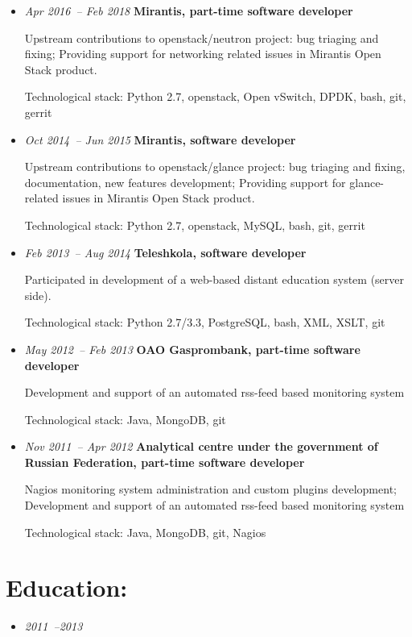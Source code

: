 \documentclass{res}
\begin{document}
\begin{resume}
\begin{itemize}
            \item \textit{Apr 2016~-- Feb 2018}
                \textbf{Mirantis, part-time software developer}

                Upstream contributions to openstack/neutron project: bug triaging and fixing; Providing support for networking related issues in Mirantis Open Stack product.

                Technological stack: Python 2.7, openstack, Open vSwitch, DPDK, bash, git, gerrit

            \item \textit{Oct 2014~-- Jun 2015}
                \textbf{Mirantis, software developer}

                Upstream contributions to openstack/glance project: bug triaging and fixing, documentation, new features development; Providing support for glance-related issues in Mirantis Open Stack product.

                Technological stack: Python 2.7, openstack, MySQL, bash, git, gerrit
            \item \textit{Feb 2013~-- Aug 2014}
                \textbf{Teleshkola, software developer}

                Participated in development of a web-based distant education system (server side).

                Technological stack: Python 2.7/3.3, PostgreSQL, bash, XML, XSLT, git
            \item \textit{May 2012~-- Feb 2013}
                \textbf{OAO Gasprombank, part-time software developer}

                Development and support of an automated rss-feed based monitoring system

                Technological stack: Java, MongoDB, git

            \item \textit{Nov 2011~-- Apr 2012}
                \textbf{Analytical centre under the government of Russian Federation, part-time software developer}

                Nagios monitoring system administration and custom plugins development; Development and support of an automated rss-feed based monitoring system

                Technological stack: Java, MongoDB, git, Nagios

        \end{itemize}

        \section{Education:}
        \begin{itemize}
          \item \textit{2011~--2013}


\end{itemize}
\end{resume}
\end{document}
